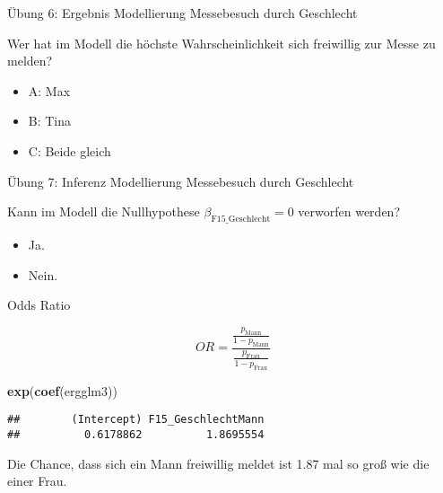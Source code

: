 \documentclass[ignorenonframetext,]{beamer}
\newenvironment{Shaded}{\begin{snugshade}}{\end{snugshade}}
\newcommand{\KeywordTok}[1]{\textcolor[rgb]{0.13,0.29,0.53}{\textbf{{#1}}}}
\newcommand{\NormalTok}[1]{{#1}}
\providecommand{\tightlist}{%
  \setlength{\itemsep}{0pt}\setlength{\parskip}{0pt}}
\begin{document}
\begin{frame}{Übung 6: Ergebnis Modellierung Messebesuch durch
Geschlecht}

Wer hat im Modell die höchste Wahrscheinlichkeit sich freiwillig zur
Messe zu melden?

\begin{itemize}
\tightlist
\item
  A: Max
\item
  B: Tina
\item
  C: Beide gleich
\end{itemize}

\end{frame}

\begin{frame}{Übung 7: Inferenz Modellierung Messebesuch durch
Geschlecht}

Kann im Modell die Nullhypothese \(\beta_{\text{F15\_Geschlecht}}=0\)
verworfen werden?

\begin{itemize}
\tightlist
\item
  Ja.
\item
  Nein.
\end{itemize}

\end{frame}

\begin{frame}[fragile]{Odds Ratio}

\[OR=\frac{\frac{p_{\text{Mann}}}{1-p_{\text{Mann}}}}{\frac{p_{\text{Frau}}}{1-p_{\text{Frau}}}}\]

\begin{Shaded}
\begin{Highlighting}[]
\KeywordTok{exp}\NormalTok{(}\KeywordTok{coef}\NormalTok{(ergglm3))}
\end{Highlighting}
\end{Shaded}

\begin{verbatim}
##        (Intercept) F15_GeschlechtMann 
##          0.6178862          1.8695554
\end{verbatim}

Die Chance, dass sich ein Mann freiwillig meldet ist 1.87 mal so groß
wie die einer Frau.

\end{frame}
\end{document}
